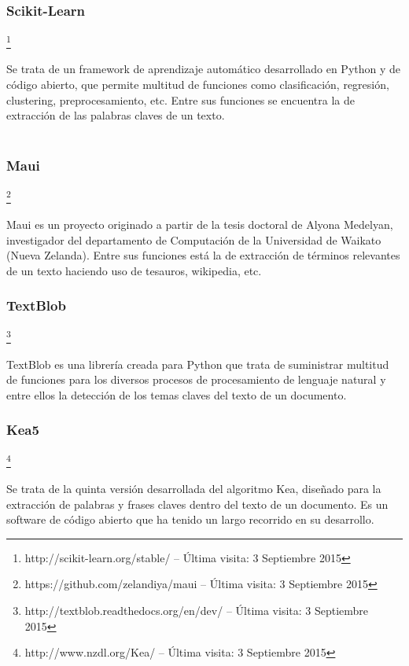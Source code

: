 \documentclass[runningheads,a4paper]{llncs}
\theoremstyle{break}
\begin{document}
\subsubsection{Scikit-Learn}\footnote{http://scikit-learn.org/stable/ -- Última visita: 3 Septiembre 2015}
\textbf{}

Se trata de un framework de aprendizaje automático desarrollado en Python y de código abierto, que permite multitud de funciones como clasificación, regresión, clustering, preprocesamiento, etc. Entre sus funciones se encuentra la de extracción de las palabras claves de un texto.
\textbf{}\\
\textbf{}\\
\pagebreak

\vspace{-1em}
\subsubsection{Maui}\footnote{https://github.com/zelandiya/maui -- Última visita: 3 Septiembre 2015}
\textbf{}

Maui es un proyecto originado a partir de la tesis doctoral de Alyona Medelyan, investigador del departamento de Computación de la Universidad de Waikato (Nueva Zelanda). Entre sus funciones está la de extracción de términos relevantes de un texto haciendo uso de tesauros, wikipedia, etc.

\vspace{-1em}
\subsubsection{TextBlob}\footnote{http://textblob.readthedocs.org/en/dev/ -- Última visita: 3 Septiembre 2015}
\textbf{}

TextBlob es una librería creada para Python que trata de suministrar multitud de funciones para los diversos procesos de procesamiento de lenguaje natural y entre ellos la detección de los temas claves del texto de un documento.

\vspace{-1em}
\subsubsection{Kea5}\footnote{http://www.nzdl.org/Kea/ -- Última visita: 3 Septiembre 2015}
\textbf{}

Se trata de la quinta versión desarrollada del algoritmo Kea, diseñado para la extracción de palabras y frases claves dentro del texto de un documento. Es un software de código abierto que ha tenido un largo recorrido en su desarrollo.
\end{document}
